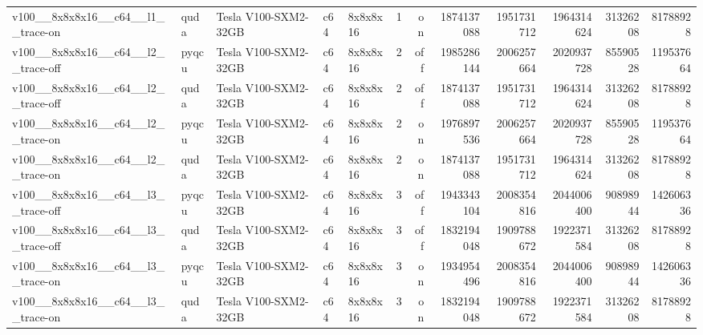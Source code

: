 \begin{table}[htbp]
\begin{tabular}{@{}lllllrrrrrrr@{}}
v100\_\_8x8x8x16\_\_c64\_\_l1\_\_trace-on & quda & Tesla V100-SXM2-32GB & c64 & 8x8x8x16 & 1 & on & 1874137088 & 1951731712 & 1964314624 & 31326208 & 81788928 \\
v100\_\_8x8x8x16\_\_c64\_\_l2\_\_trace-off & pyqcu & Tesla V100-SXM2-32GB & c64 & 8x8x8x16 & 2 & off & 1985286144 & 2006257664 & 2020937728 & 85590528 & 119537664 \\
v100\_\_8x8x8x16\_\_c64\_\_l2\_\_trace-off & quda & Tesla V100-SXM2-32GB & c64 & 8x8x8x16 & 2 & off & 1874137088 & 1951731712 & 1964314624 & 31326208 & 81788928 \\
v100\_\_8x8x8x16\_\_c64\_\_l2\_\_trace-on & pyqcu & Tesla V100-SXM2-32GB & c64 & 8x8x8x16 & 2 & on & 1976897536 & 2006257664 & 2020937728 & 85590528 & 119537664 \\
v100\_\_8x8x8x16\_\_c64\_\_l2\_\_trace-on & quda & Tesla V100-SXM2-32GB & c64 & 8x8x8x16 & 2 & on & 1874137088 & 1951731712 & 1964314624 & 31326208 & 81788928 \\
v100\_\_8x8x8x16\_\_c64\_\_l3\_\_trace-off & pyqcu & Tesla V100-SXM2-32GB & c64 & 8x8x8x16 & 3 & off & 1943343104 & 2008354816 & 2044006400 & 90898944 & 142606336 \\
v100\_\_8x8x8x16\_\_c64\_\_l3\_\_trace-off & quda & Tesla V100-SXM2-32GB & c64 & 8x8x8x16 & 3 & off & 1832194048 & 1909788672 & 1922371584 & 31326208 & 81788928 \\
v100\_\_8x8x8x16\_\_c64\_\_l3\_\_trace-on & pyqcu & Tesla V100-SXM2-32GB & c64 & 8x8x8x16 & 3 & on & 1934954496 & 2008354816 & 2044006400 & 90898944 & 142606336 \\
v100\_\_8x8x8x16\_\_c64\_\_l3\_\_trace-on & quda & Tesla V100-SXM2-32GB & c64 & 8x8x8x16 & 3 & on & 1832194048 & 1909788672 & 1922371584 & 31326208 & 81788928 \\
\bottomrule
\end{tabular}
\end{table}
